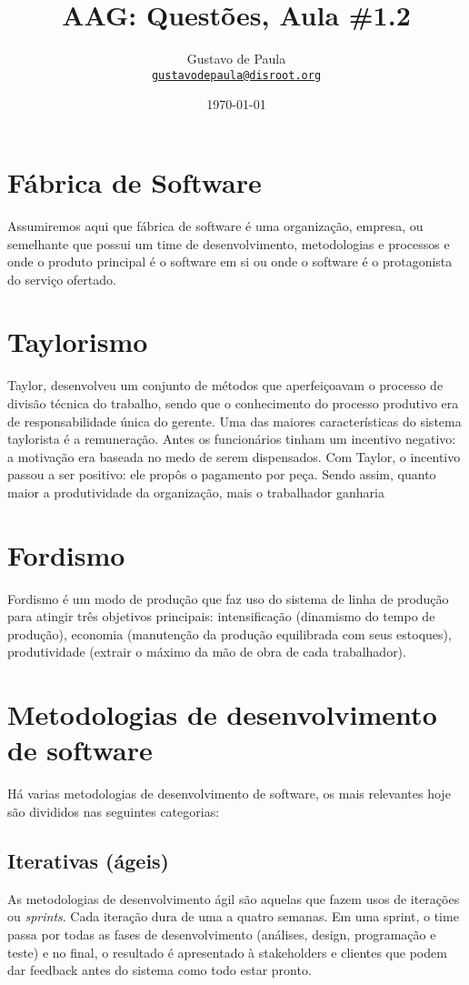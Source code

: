 \documentclass[11pt]{article}
\author{Gustavo de Paula\\ \texttt{\href{mailto:gustavodepaula@disroot.org}{gustavodepaula@disroot.org}}}
\date{\today}
\title{AAG: Questões, Aula \#1.2}
\begin{document}
\maketitle
\tableofcontents


\section{Fábrica de Software}
\label{sec:org1457263}
Assumiremos aqui que fábrica de software é uma organização, empresa, ou
semelhante que possui um time de desenvolvimento, metodologias e processos e
onde o produto principal é o software em si ou onde o software é o
protagonista do serviço ofertado.

\section{Taylorismo}
\label{sec:orgd8ce42a}
Taylor, desenvolveu um conjunto de métodos que aperfeiçoavam o processo de
divisão técnica do trabalho, sendo que o conhecimento do processo produtivo era
de responsabilidade única do gerente. Uma das maiores características do sistema
taylorista é a remuneração. Antes os funcionários tinham um incentivo negativo:
a motivação era baseada no medo de serem dispensados. Com Taylor, o incentivo
passou a ser positivo: ele propôs o pagamento por peça. Sendo assim, quanto
maior a produtividade da organização, mais o trabalhador ganharia

\section{Fordismo}
\label{sec:org19aa231}
Fordismo é um modo de produção que faz uso do sistema de linha de produção para
atingir três objetivos principais: intensificação (dinamismo do tempo de
produção), economia (manutenção da produção equilibrada com seus estoques),
produtividade (extrair o máximo da mão de obra de cada trabalhador).

\section{Metodologias de desenvolvimento de software}
\label{sec:org2f16c1d}
Há varias metodologias de desenvolvimento de software, os mais relevantes hoje
são divididos nas seguintes categorias:
\subsection{Iterativas (ágeis)}
\label{sec:org5ad4a59}
As metodologias de desenvolvimento ágil são aquelas que fazem usos de iterações
ou \emph{sprints}. Cada iteração dura de uma a quatro semanas. Em uma sprint, o time
passa por todas as fases de desenvolvimento (análises, design, programação e
teste) e no final, o resultado é apresentado à stakeholders e clientes que podem
dar feedback antes do sistema como todo estar pronto.
\end{document}
